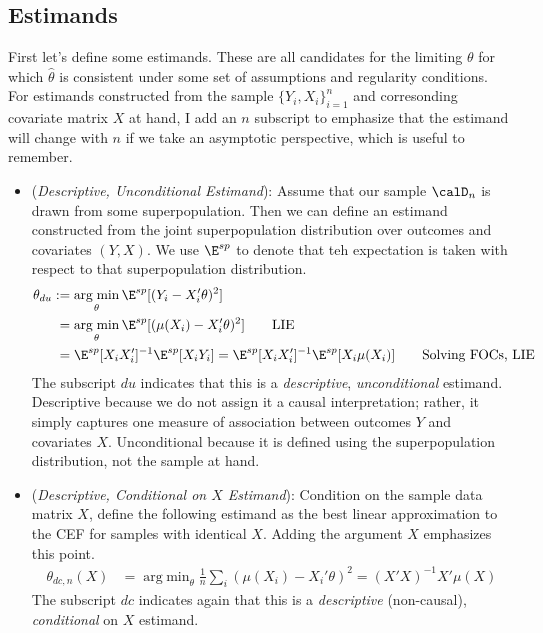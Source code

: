 \documentclass[12pt]{article}
\theoremstyle{plain}
\theoremstyle{definition}
\theoremstyle{remark}
\DeclareMathOperator*{\argmin}{arg\;min}
\begin{document}
\subsection{Estimands}
First let's define some estimands.
These are all candidates for the limiting $\theta$ for which
$\hat{\theta}$ is consistent under some set of assumptions and
regularity conditions.
For estimands constructed from the sample $\{Y_i,X_i\}_{i=1}^n$ and
corresonding covariate matrix $X$ at hand, I add an $n$ subscript to
emphasize that the estimand will change with $n$ if we take an
asymptotic perspective, which is useful to remember.
\begin{itemize}
  \item (\emph{Descriptive, Unconditional Estimand}):
    Assume that our sample $\calD_n$ is drawn from some superpopulation.
    Then we can define an estimand constructed from the joint
    superpopulation distribution over outcomes and covariates
    $(Y,X)$.
    We use $\E^{sp}$ to denote that teh expectation is taken with
    respect to that superpopulation distribution.
    \begin{align*}
      \theta_{du}
      &:=
      \argmin_{\theta}
      \E^{sp}[(Y_i-X_i'\theta)^2]
      \\
      &\hphantom{:}=
      \argmin_{\theta}
      \E^{sp}[(\mu(X_i)-X_i'\theta)^2]
      \qquad
      \text{LIE}
      \\
      &\hphantom{:}=
      \E^{sp}[X_iX_i']^{-1}
      \E^{sp}[X_iY_i]
      =
      \E^{sp}[X_iX_i']^{-1}
      \E^{sp}[X_i\mu(X_i)]
      \qquad
      \text{Solving FOCs, LIE}
    \end{align*}
    The subscript $du$ indicates that this is a \emph{descriptive},
    \emph{unconditional} estimand.
    Descriptive because we do not assign it a causal interpretation;
    rather, it simply captures one measure of association between
    outcomes $Y$ and covariates $X$.
    Unconditional because it is defined using the superpopulation
    distribution, not the sample at hand.


  \item
    (\emph{Descriptive, Conditional on $X$ Estimand}):
    Condition on the sample data matrix $X$, define the following
    estimand as the best linear approximation to the CEF for samples
    with identical $X$.
    Adding the argument $X$ emphasizes this point.
    \begin{align*}
      \theta_{dc,n}(X)
      &=
      \argmin_{\theta}
      \frac{1}{n}
      \sum_i
      (\mu(X_i)-X_i'\theta)^2
      =
      (X'X)^{-1}X'\mu(X)
    \end{align*}
    The subscript $dc$ indicates again that this is a \emph{descriptive}
    (non-causal), \emph{conditional} on $X$ estimand.



\end{itemize}
\end{document}
